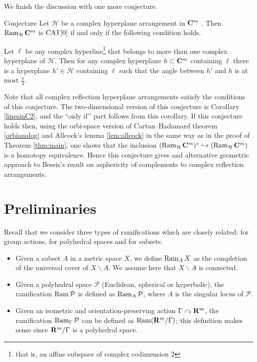 \documentclass{compositio}
\begin{document}
We finish the discussion with one more conjecture.

\begin{thm}{Conjecture} Let $\mathcal H$ be
a complex hyperplane arrangement in $\mathbf{C}^m$ . Then  $\mathop{\rm Ram}\nolimits_{\mathcal H} \mathbf{C}^m$ is $\mathrm{CAT}[0]$
if and only if the following condition holds.

Let $\ell$ be any complex hyperline\footnote{that is, an affine subspace of complex codimension 2}
that belongs to more than one complex hyperplane of $\mathcal H$.
Then for any complex hyperplane $h\subset \mathbf{C}^m$ containing $\ell$ there is a hyperplane
$h'\in \mathcal H$ containing $\ell$ such that the angle between
$h'$ and $h$ is at most $\frac{\pi}{4}$.
\end{thm}

Note that all complex reflection hyperplane arrangements satisfy the conditions of this conjecture.
The two-dimensional version of this conjecture is Corollary \ref{linesinC2},
and the ``only if'' part follows from this corollary.
If this conjecture holds then, using the orbi-space version of Cartan--Hadamard theorem \ref{orbianalog}
and Allcock's lemma \ref{lem:allcock} in the same way as in the proof of Theorem \ref{thm:main},
one shows that the inclusion
$(\mathop{\rm Ram}\nolimits_{\mathcal H}\mathbf{C}^m)^\circ\hookrightarrow(\mathop{\rm Ram}\nolimits_{\mathcal H}\mathbf{C}^m)$ is a homotopy equivalence.
Hence this conjecture gives and alternative geometric approach to Bessis's result  \cite{bessis} on asphericity of complements to complex reflection arrangements.

\section{Preliminaries}\label{sec:prelim}

Recall that we consider three types of ramifications which are closely related:
for group actions, for polyhedral spaces and for subsets.

\begin{itemize}
\item Given a subset $A$ in a metric space $X$, we define $\mathop{\rm Ram}\nolimits_A X$ as  the completion of the universal cover of $X\backslash A$. We assume here that $X\backslash A$ is connected.
\item Given a polyhedral space $\mathcal{P}$ (Euclidean, spherical or hyperbolic), the ramification $\mathop{\rm Ram}\nolimits \mathcal{P}$ is defined as $\mathop{\rm Ram}\nolimits_{A} \mathcal{P}$, where $A$ is the singular locus of $\mathcal{P}$.
\item Given an isometric and orientation-preserving action $\Gamma\curvearrowright\mathbf{R}^m$, the ramification $\mathop{\rm Ram}\nolimits_{\Gamma} \mathcal{P}$ can be defined as $\mathop{\rm Ram}\nolimits (\mathbf{R}^m/\Gamma)$;
this definition makes sense since $\mathbf{R}^m/\Gamma$ is a polyhedral space.
\end{itemize}
\end{document}
